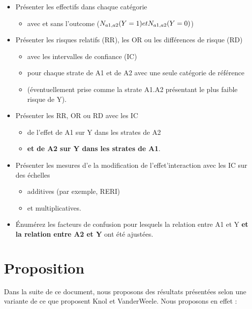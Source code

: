 \documentclass[
]{book}
\providecommand{\tightlist}{%
  \setlength{\itemsep}{0pt}\setlength{\parskip}{0pt}}
\begin{document}
\begin{itemize}
\tightlist
\item
  Présenter les effectifs dans chaque catégorie

  \begin{itemize}
  \tightlist
  \item
    avec et sans l'outcome (\(\small N_{a1,a2}(Y=1) et N_{a1,a2}(Y=0)\))
  \end{itemize}
\item
  Présenter les risques relatifs (RR), les OR ou les différences de risque (RD)

  \begin{itemize}
  \tightlist
  \item
    avec les intervalles de confiance (IC)
  \item
    pour chaque strate de A1 et de A2 avec une seule catégorie de référence
  \item
    (éventuellement prise comme la strate A1.A2 présentant le plus faible risque de Y).
  \end{itemize}
\item
  Présenter les RR, OR ou RD avec les IC

  \begin{itemize}
  \tightlist
  \item
    de l'effet de A1 sur Y dans les strates de A2
  \item
    \textbf{et de A2 sur Y dans les strates de A1}.
  \end{itemize}
\item
  Présenter les mesures d'e la modification de l'effet'interaction avec les IC sur des échelles

  \begin{itemize}
  \tightlist
  \item
    additives (par exemple, RERI)
  \item
    et multiplicatives.
  \end{itemize}
\item
  Énumérez les facteurs de confusion pour lesquels la relation entre A1 et Y \textbf{et la relation entre A2 et Y} ont été ajustées.
\end{itemize}

\hypertarget{proposition}{%
\section{Proposition}\label{proposition}}

Dans la suite de ce document, nous proposons des résultats présentées selon une variante de ce que proposent Knol et VanderWeele. Nous proposons en effet :
\end{document}
